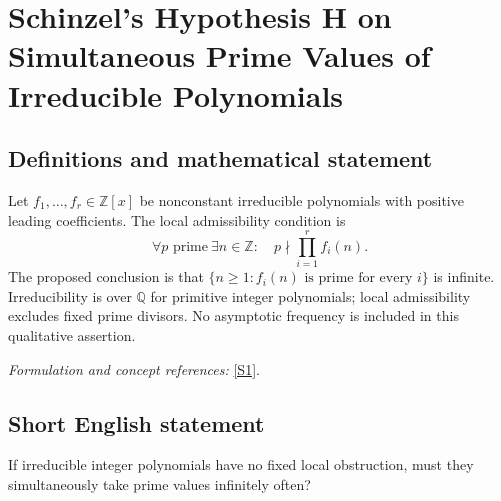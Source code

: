 \documentclass[11pt]{article}
\newcommand{\Z}{\mathbb{Z}}
\newcommand{\Q}{\mathbb{Q}}
\newcommand{\sref}[2]{\hyperlink{source:#1:#2}{[S#2]}}
\newif\ifshowcatalogue
\newcommand{\cataloguescope}[1]{\ifshowcatalogue
 \paragraph{Exact scope in the supplied catalogue.}
 \begin{quote}\small #1\end{quote}\fi}
\begin{document}
\setcounter{section}{53}
\clearpage
\section{\texorpdfstring{Schinzel's Hypothesis H on Simultaneous Prime Values of Irreducible Polynomials}{Schinzel's Hypothesis H on Simultaneous Prime Values of Irreducible Polynomials}}\label{54}
\subsection{Definitions and mathematical statement}
Let $f_1,\ldots,f_r\in\Z[x]$ be nonconstant irreducible polynomials with positive leading coefficients. The local admissibility condition is
\[
 \forall p\text{ prime}\ \exists n\in\Z:\quad p\nmid\prod_{i=1}^r f_i(n).
\]
The proposed conclusion is that $\{n\ge1:f_i(n)\text{ is prime for every }i\}$ is infinite. Irreducibility is over $\Q$ for primitive integer polynomials; local admissibility excludes fixed prime divisors. No asymptotic frequency is included in this qualitative assertion.
\par\smallskip\textit{Formulation and concept references:} \sref{54}{1}.
\cataloguescope{Let f1,...,fr in Z[x] be irreducible with positive leading coefficients and no prime dividing f1(n)...fr(n) for every n. Prove that infinitely many positive integers n make every fi(n) prime.}
\subsection{Short English statement}
If irreducible integer polynomials have no fixed local obstruction, must they simultaneously take prime values infinitely often?
\end{document}
